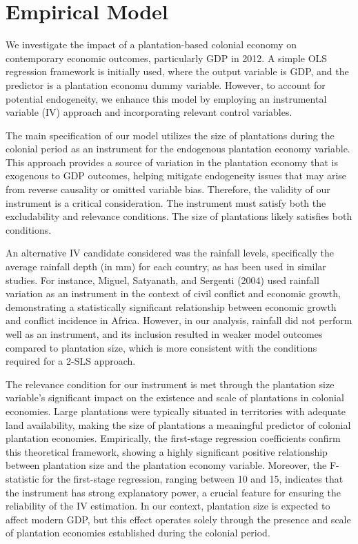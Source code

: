 \documentclass[12pt]{article}
\begin{document}
\newpage

\section{Empirical Model}

\vspace{0.2 in} 
We investigate the impact of a plantation-based colonial economy on contemporary economic outcomes, particularly GDP in 2012. A simple OLS regression framework is initially used, where the output variable is GDP, and the predictor is a plantation economu dummy variable. However, to account for potential endogeneity, we enhance this model by employing an instrumental variable (IV) approach and incorporating relevant control variables. 

\vspace{0.2 in} 
\noindent The main specification of our model utilizes the size of plantations during the colonial period as an instrument for the endogenous plantation economy variable. This approach provides a source of variation in the plantation economy that is exogenous to GDP outcomes, helping mitigate endogeneity issues that may arise from reverse causality or omitted variable bias. Therefore, the validity of our instrument is a critical consideration. The instrument must satisfy both the excludability and relevance conditions. The size of plantations likely satisfies both conditions. 

\vspace{0.2 in} 
\noindent An alternative IV candidate considered was the rainfall levels, specifically the average rainfall depth (in mm) for each country, as has been used in similar studies. For instance, Miguel, Satyanath, and Sergenti (2004) used rainfall variation as an instrument in the context of civil conflict and economic growth, demonstrating a statistically significant relationship between economic growth and conflict incidence in Africa. However, in our analysis, rainfall did not perform well as an instrument, and its inclusion resulted in weaker model outcomes compared to plantation size, which is more consistent with the conditions required for a 2-SLS approach.

\vspace{0.2 in} 
\noindent The relevance condition for our instrument is met through the plantation size variable's significant impact on the existence and scale of plantations in colonial economies. Large plantations were typically situated in territories with adequate land availability, making the size of plantations a meaningful predictor of colonial plantation economies. Empirically, the first-stage regression coefficients confirm this theoretical framework, showing a highly significant positive relationship between plantation size and the plantation economy variable. Moreover, the F-statistic for the first-stage regression, ranging between 10 and 15, indicates that the instrument has strong explanatory power, a crucial feature for ensuring the reliability of the IV estimation. In our context, plantation size is expected to affect modern GDP, but this effect operates solely through the presence and scale of plantation economies established during the colonial period.
\end{document}
